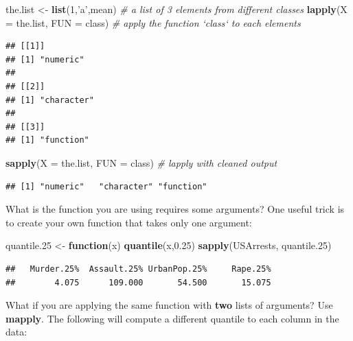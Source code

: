 \documentclass[]{book}
\newenvironment{Shaded}{\begin{snugshade}}{\end{snugshade}}
\newcommand{\CommentTok}[1]{\textcolor[rgb]{0.56,0.35,0.01}{\textit{#1}}}
\newcommand{\ControlFlowTok}[1]{\textcolor[rgb]{0.13,0.29,0.53}{\textbf{#1}}}
\newcommand{\DataTypeTok}[1]{\textcolor[rgb]{0.13,0.29,0.53}{#1}}
\newcommand{\DecValTok}[1]{\textcolor[rgb]{0.00,0.00,0.81}{#1}}
\newcommand{\FloatTok}[1]{\textcolor[rgb]{0.00,0.00,0.81}{#1}}
\newcommand{\KeywordTok}[1]{\textcolor[rgb]{0.13,0.29,0.53}{\textbf{#1}}}
\newcommand{\NormalTok}[1]{#1}
\newcommand{\StringTok}[1]{\textcolor[rgb]{0.31,0.60,0.02}{#1}}
\theoremstyle{definition}
\theoremstyle{definition}
\theoremstyle{definition}
\theoremstyle{remark}
\begin{document}
\begin{Shaded}
\begin{Highlighting}[]
\NormalTok{the.list <-}\StringTok{ }\KeywordTok{list}\NormalTok{(}\DecValTok{1}\NormalTok{,}\StringTok{'a'}\NormalTok{,mean) }\CommentTok{# a list of 3 elements from different classes}
\KeywordTok{lapply}\NormalTok{(}\DataTypeTok{X =}\NormalTok{ the.list, }\DataTypeTok{FUN =}\NormalTok{ class) }\CommentTok{# apply the function `class` to each elements}
\end{Highlighting}
\end{Shaded}

\begin{verbatim}
## [[1]]
## [1] "numeric"
## 
## [[2]]
## [1] "character"
## 
## [[3]]
## [1] "function"
\end{verbatim}

\begin{Shaded}
\begin{Highlighting}[]
\KeywordTok{sapply}\NormalTok{(}\DataTypeTok{X =}\NormalTok{ the.list, }\DataTypeTok{FUN =}\NormalTok{ class) }\CommentTok{# lapply with cleaned output}
\end{Highlighting}
\end{Shaded}

\begin{verbatim}
## [1] "numeric"   "character" "function"
\end{verbatim}

What is the function you are using requires some arguments?
One useful trick is to create your own function that takes only one argument:

\begin{Shaded}
\begin{Highlighting}[]
\NormalTok{quantile}\FloatTok{.25}\NormalTok{ <-}\StringTok{ }\ControlFlowTok{function}\NormalTok{(x) }\KeywordTok{quantile}\NormalTok{(x,}\FloatTok{0.25}\NormalTok{)}
\KeywordTok{sapply}\NormalTok{(USArrests, quantile}\FloatTok{.25}\NormalTok{)}
\end{Highlighting}
\end{Shaded}

\begin{verbatim}
##   Murder.25%  Assault.25% UrbanPop.25%     Rape.25% 
##        4.075      109.000       54.500       15.075
\end{verbatim}

What if you are applying the same function with \textbf{two} lists of arguments? Use \textbf{mapply}.
The following will compute a different quantile to each column in the data:
\end{document}
